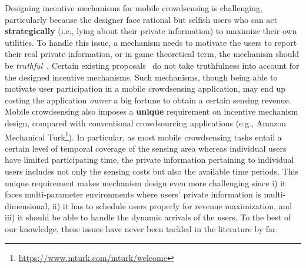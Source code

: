 \documentclass[10pt,journal,compsoc]{IEEEtran}
\begin{document}
  Designing incentive mechanisms for mobile crowdsensing is challenging, particularly because the designer face rational but selfish users who can act \textbf{strategically} (i.e., lying about their private information) to maximize their own utilities. To handle this issue, a mechanism needs to motivate the users to report their real private information, or in game theoretical term, the mechanism should be \textit{truthful}~\cite{Nisan2007}. Certain existing proposals~\cite{Lee2010,Jaimes2012,Qinghua2013} do not take truthfulness into account for the designed incentive mechanisms. Such mechanisms, though being able to motivate user participation in a mobile crowdsensing application, may end up costing the application \textit{owner} a big fortune to obtain a certain sensing revenue. 
  Mobile crowdsensing also imposes a \textbf{unique} requirement on incentive mechanism design, compared with conventional crowdsourcing applications (e.g., Amazon Mechanical Turk\footnote{\url{https://www.mturk.com/mturk/welcome}}). In particular, as most mobile crowdsensing tasks entail a certain level of temporal coverage of the sensing area \cite{GantiYL2011} whereas individual users have limited participating time, the private information pertaining to individual users includes not only the sensing costs but also the available time periods. This unique requirement makes mechanism design even more challenging since i) it faces multi-parameter environments where users' private information is multi-dimensional, ii) it has to schedule users properly for revenue maximization, and iii) it should be able to handle the dynamic arrivals of the users. To the best of our knowledge, these issues have never been tackled in the literature by far.
\end{document}
